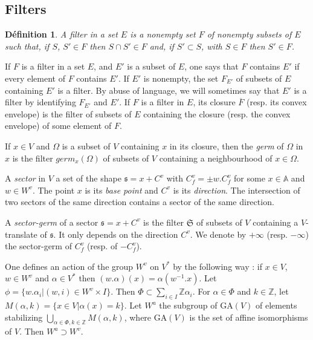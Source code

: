 \documentclass[12pt]{article}
\theoremstyle{plain}
\newtheorem{defin}[thm]{Définition}
\theoremstyle{definition}
\newcommand{\Z}{\mathbb{Z}}
\begin{document}
\subsection{Filters}

\begin{defin}
A filter in a set $E$ is a nonempty set $F$ of nonempty subsets of $E$ such that, if $S$, $S'\in F$ then $S\cap S'\in F$ and, if $S'\subset S$, with $S\in F$ then $S'\in F$.
\end{defin}

If $F$ is a filter in a set $E$, and $E'$ is a subset of $E$, one says that $F$ contains $E'$ if every element of $F$ contains $E'$. If $E'$ is nonempty, the set $F_{E'}$ of subsets of $E$ containing $E'$ is a filter. By abuse of language, we will sometimes say that $E'$ is a filter by identifying $F_{E'}$ and $E'$. If $F$ is a filter in $E$, its closure $\overline F$ (resp. its convex envelope) is the filter of subsets of $E$ containing the closure (resp. the convex envelope) of some element of $F$.

If $x\in V\mathrm{}$ and $\Omega$ is a subset of $V$ containing $x$ in its closure, then the \textit{germ} of $\Omega$ in $x$ is the filter $germ_x(\Omega)$ of subsets of $V$ containing a neighbourhood of $x\in \Omega$.

A \textit{sector} in $V$ a set of the shape $\mathfrak{s}=x+C^v$ with $C_f^v=\pm w.C_f^v$ for some $x\in \mathbb{A}$ and $w\in W^v$. The point $x$ is its \textit{base point} and $C^v$ is its \textit{direction}. The intersection of two sectors of the same direction contains a sector of the same direction.



A \textit{sector-germ} of a sector $\mathfrak{s}=x+C^v$ is the filter $\mathfrak{S}$ of subsets of $V$ containing a $V$-translate of $\mathfrak{s}$. It only depends on the direction $C^v$. We denote by $+\infty$ (resp. $-\infty$) the sector-germ of $C_f^v$ (resp. of $-C_f^v$).


One defines an action of the group $W^v$ on $V^*$ by the following way : if $x\in V$, $w\in W^v$ and $\alpha\in V^*$ then $(w.\alpha)(x)=\alpha(w^{-1}.x)$. Let $\phi=\{w.\alpha_i|(w,i)\in W^v\times I\}$. Then $\Phi\subset \sum_{i\in I}\Z\alpha_i$. For $\alpha\in \Phi$ and $k\in \mathbb{Z}$, let $M(\alpha,k)=\{x\in V\mathrm{}|\alpha(x)=k\}$. Let $W^a$ the subgroup of $\mathrm{GA}(V\mathrm{})$ of elements stabilizing $\bigcup_{\alpha \in \Phi, k\in \Z} M(\alpha,k)$, where $\mathrm{GA}(V\mathrm{})$ is the set of affine isomorphisms of $V$. Then $W^a\supset W^v$.
\end{document}
